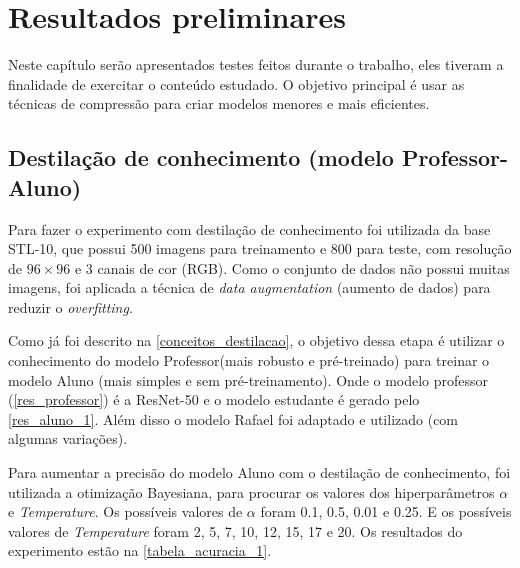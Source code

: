 \chapter{Resultados preliminares}

Neste capítulo serão apresentados testes feitos durante o trabalho, eles tiveram a finalidade de exercitar o
conteúdo estudado. O objetivo principal é usar as técnicas de compressão para criar modelos menores e mais eficientes.


\section{Destilação de conhecimento (modelo Professor-Aluno)}
Para fazer o experimento com destilação de conhecimento foi utilizada da base STL-10, que possui 500 imagens para
treinamento e 800 para teste, com resolução de $96 \times 96$ e 3 canais de cor (RGB). Como o conjunto de dados
não possui muitas imagens, foi aplicada a técnica de \textit{data augmentation} (aumento de dados) para reduzir o
\textit{overfitting}.

Como já foi descrito na \autoref{conceitos_destilacao}, o objetivo dessa etapa é utilizar o conhecimento do modelo
Professor(mais robusto e pré-treinado) para treinar o modelo Aluno (mais simples e sem pré-treinamento).
Onde o modelo professor (\autoref{res_professor}) é a ResNet-50  \cite{resnet} e o modelo estudante é gerado pelo
\autoref{res_aluno_1}.
Além disso o modelo Rafael \cite{rafael} foi adaptado e utilizado (com algumas variações).

Para aumentar a precisão do modelo Aluno com o destilação de conhecimento, foi utilizada a otimização
Bayesiana, para procurar os valores dos hiperparâmetros $\alpha$ e \textit{Temperature}.
Os possíveis valores de $\alpha$ foram 0.1, 0.5, 0.01 e 0.25.
E os possíveis valores de \textit{Temperature} foram 2, 5, 7, 10, 12, 15, 17 e 20.
Os resultados do experimento estão na \autoref{tabela_acuracia_1}.



